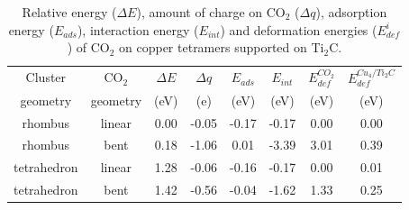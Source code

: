 \begin{table}
 
 \label{tab:04}
  \begin{center}
   
    \begin{tabular}{|*{8}{c|}}
    \hline
  Cluster & CO$_2$ & $\Delta E$ & $\Delta q$ & $E_{ads}$ & $E_{int}$ & $E_{def}^{CO_2}$& $E_{def}^{Cu_{4}/Ti_{2}C}$\\
         geometry          &        geometry         & (eV) & (e) & (eV) & (eV) & (eV) & (eV) \\
    \hline
    rhombus   &  linear  & 0.00 & -0.05 & -0.17 & -0.17 & 0.00 & 0.00\\
    \hline
    rhombus & bent & 0.18 & -1.06 & 0.01 & -3.39 & 3.01 & 0.39 \\
    \hline
    tetrahedron & linear & 1.28 & -0.06 & -0.16 & -0.17 & 0.00 & 0.01 \\
    \hline
    tetrahedron & bent & 1.42 & -0.56 & -0.04 & -1.62 & 1.33 & 0.25 \\
			\hline 
			  



  \end{tabular}
  \end{center}
  \caption{Relative energy ($\Delta E$), amount of charge on CO$_2$ ($\Delta q$), adsorption energy ($E_{ads}$),
  interaction energy ($E_{int}$) and deformation energies ($E_{def}^i$) of CO$_2$ on copper tetramers supported on Ti$_2$C.}
\end{table} 


   
